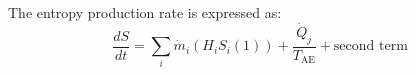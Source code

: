 The entropy production rate is expressed as:  
\[
\frac{dS}{dt} = \sum_i \dot{m}_i \left( H_i S_i(1) \right) + \frac{\dot{Q}_j}{T_{\text{AE}}} + \text{second term}
\]